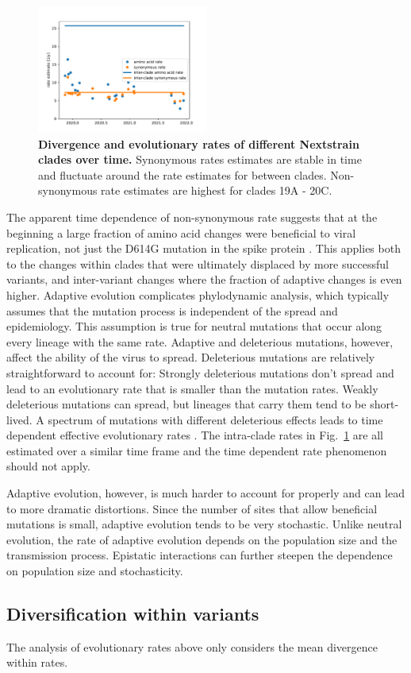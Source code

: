 \documentclass[aps,rmp, twocolumn]{revtex4}
\begin{document}
\begin{figure}
    \includegraphics[width=0.5\textwidth]{figures/rate_progression.pdf}
    \caption[]{{\bf Divergence and evolutionary rates of different Nextstrain clades over time.} Synonymous rates estimates are stable in time and fluctuate around the rate estimates for between clades. Non-synonymous rate estimates are highest for clades 19A - 20C.
    \label{fig:rate_progression} }
\end{figure}

The apparent time dependence of non-synonymous rate suggests that at the beginning a large fraction of amino acid changes were beneficial to viral replication, not just the D614G mutation in the spike protein \citep{korber_tracking_2020}.
This applies both to the changes within clades that were ultimately displaced by more successful variants, and inter-variant changes where the fraction of adaptive changes is even higher.
Adaptive evolution complicates phylodynamic analysis, which typically assumes that the mutation process is independent of the spread and epidemiology.
This assumption is true for neutral mutations that occur along every lineage with the same rate.
Adaptive and deleterious mutations, however, affect the ability of the virus to spread.
Deleterious mutations are relatively straightforward to account for: Strongly deleterious mutations don't spread and lead to an evolutionary rate that is smaller than the mutation rates.
Weakly deleterious mutations can spread, but lineages that carry them tend to be short-lived.
A spectrum of mutations with different deleterious effects leads to time dependent effective evolutionary rates \citep{wertheim_purifying_2011}.
The intra-clade rates in Fig.~\ref{fig:rate_progression} are all estimated over a similar time frame and the time dependent rate phenomenon should not apply.

Adaptive evolution, however, is much harder to account for properly and can lead to more dramatic distortions.
Since the number of sites that allow beneficial mutations is small, adaptive evolution tends to be very stochastic.
Unlike neutral evolution, the rate of adaptive evolution depends on the population size and the transmission process.
Epistatic interactions can further steepen the dependence on population size and stochasticity.



\subsection*{Diversification within variants}
The analysis of evolutionary rates above only considers the mean divergence within rates.



\end{document}
